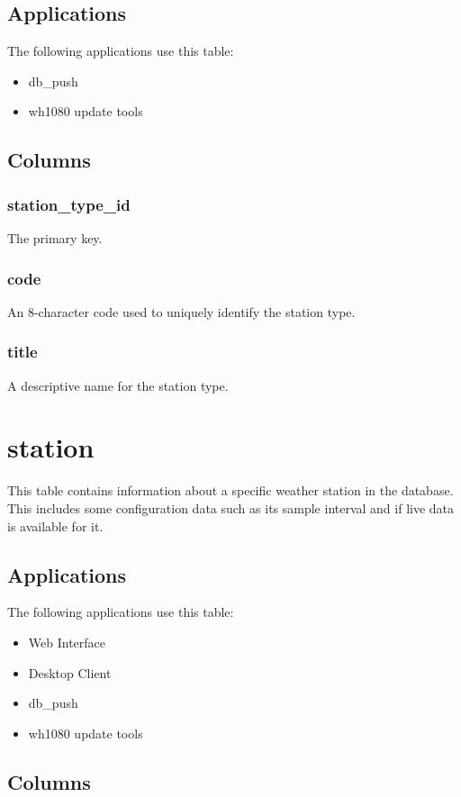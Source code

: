 \documentclass[a4paper,10pt]{book}
\begin{document}
\subsection{Applications}
The following applications use this table:
\begin{itemize}
\item db\_push
\item wh1080 update tools
\end{itemize}

\subsection{Columns}

\subsubsection{station\_type\_id}
The primary key.

\subsubsection{code}
An 8-character code used to uniquely identify the station type.

\subsubsection{title}
A descriptive name for the station type.
 
 
\section{station}
\label{tbl_station}
This table contains information about a specific weather station in the database. This includes some configuration data such as its sample interval and if live data is available for it.

\subsection{Applications}
The following applications use this table:
\begin{itemize}
\item Web Interface
\item Desktop Client
\item db\_push
\item wh1080 update tools
\end{itemize}
 
\subsection{Columns}
\end{document}
